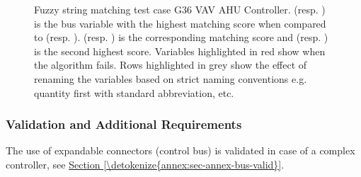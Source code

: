 \documentclass[letterpaper,10pt, openany,english]{sphinxmanual}
\begin{document}
\begin{figure}[htbp]
\centering
\capstart

\noindent{}
\caption{Fuzzy string matching test case \textendash{} G36 VAV AHU Controller.
 (resp. ) is the bus variable with the highest matching score when compared to  (resp. ).  (resp. ) is the corresponding matching score and        (resp. ) is the second highest score. Variables highlighted in red show when the algorithm fails. Rows highlighted in grey show the effect of renaming the variables based on strict naming conventions e.g. quantity first with standard abbreviation, etc.}\label{\detokenize{requirements:fig-string-match}}\end{figure}


\subsubsection{Validation and Additional Requirements}
\label{\detokenize{requirements:validation-and-additional-requirements}}
The use of expandable connectors (control bus) is validated in case of a complex controller, see \hyperref[\detokenize{annex:sec-annex-bus-valid}]{Section \ref{\detokenize{annex:sec-annex-bus-valid}}}.
\end{document}
